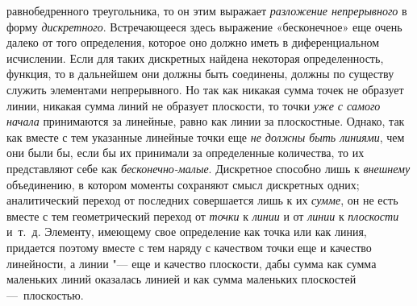 {равнобедренного треугольника, то он этим выражает
{\em разложение непрерывного} в форму
{\em дискретного}. Встречающееся здесь выражение
«бесконечное» еще очень далеко от того определения, которое оно должно
иметь в диференциальном исчислении. Если для таких дискретных найдена
некоторая определенность, функция, то в дальнейшем они должны быть
соединены, должны по существу служить элементами непрерывного. Но так как
никакая сумма точек не образует линии, никакая сумма линий не образует
плоскости, то точки {\em уже с самого начала}
принимаются за линейные, равно как линии за плоскостные. Однако, так как
вместе с тем указанные линейные точки еще {\em не
должны быть линиями}, чем они были бы, если бы их принимали за определенные
количества, то их представляют себе как
{\em бесконечно-малые}. Дискретное способно лишь к
{\em внешнему} объединению, в котором моменты сохраняют
смысл дискретных одних; аналитический переход от последних совершается лишь
к их {\em сумме}, он не есть вместе с тем
геометрический переход от {\em точки} к
{\em линии} и от {\em линии} к
{\em плоскости} и~т.~д. Элементу, имеющему свое
определение как точка или как линия, придается поэтому вместе с тем наряду
с качеством точки еще и качество линейности, а линии "--- еще и качество
плоскости, дабы сумма как сумма маленьких линий оказалась линией и как
сумма маленьких плоскостей —~плоскостью.

}
